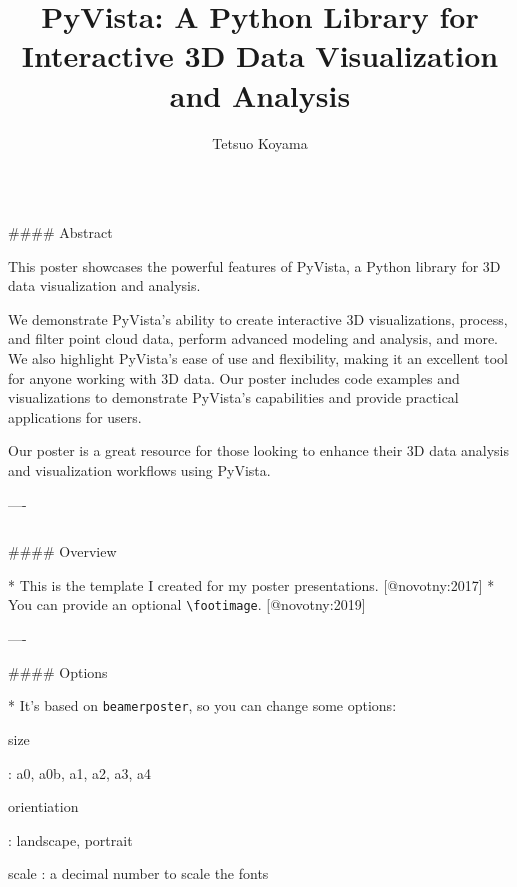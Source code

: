 \documentclass{beamer}
\author[tkoyama@gmail.com]{Tetsuo Koyama}
\title{PyVista: A Python Library for Interactive 3D Data Visualization and Analysis}
\institute{PyVista community}
\begin{document}
\begin{frame}[fragile]\centering

\begin{columns}
\begin{column}{1.0\textwidth}

\begin{markdown}

#### Abstract

This poster showcases the powerful features of PyVista, a Python library for 3D data visualization and analysis.

We demonstrate PyVista's ability to create interactive 3D visualizations, process, and filter point cloud data, perform advanced modeling and analysis, and more.
We also highlight PyVista's ease of use and flexibility, making it an excellent tool for anyone working with 3D data.
Our poster includes code examples and visualizations to demonstrate PyVista's capabilities and provide practical applications for users.

Our poster is a great resource for those looking to enhance their 3D data analysis and visualization workflows using PyVista.

----
\end{markdown}
\end{column}
\end{columns}

\bigskip
{\hrulefill}
\bigskip

\begin{columns}[T]

\begin{column}{.46\textwidth}

\begin{markdown}

#### Overview

* This is the template I created for my poster presentations. [@novotny:2017]
* You can provide an optional \texttt{\textbackslash footimage}. [@novotny:2019]

----


#### Options

* It's based on \texttt{beamerposter}, so you can change some options:

    size
    
    :   a0, a0b, a1, a2, a3, a4

    orientiation
    
    :   landscape, portrait
    
    scale
    :   a decimal number to scale the fonts


\end{markdown}
\end{column}
\end{columns}
\end{frame}
\end{document}
